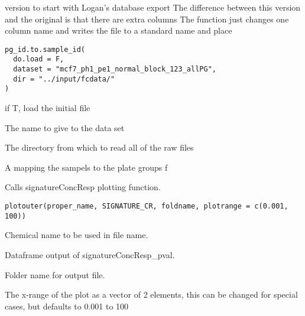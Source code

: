 \documentclass[letterpaper]{book}
\begin{document}
%
\begin{Description}\relax
version to start with Logan's database export
The difference between this version and the original is that there are extra columns
The function just changes one column name and writes the file to a standard name and place
\end{Description}
%
\begin{Usage}
\begin{verbatim}
pg_id.to.sample_id(
  do.load = F,
  dataset = "mcf7_ph1_pe1_normal_block_123_allPG",
  dir = "../input/fcdata/"
)
\end{verbatim}
\end{Usage}
%
\begin{Arguments}
\begin{ldescription}
\item[\code{do.load}] if T, load the initial file

\item[\code{dataset}] The name to give to the data set

\item[\code{dir}] The directory from which to read all of the raw files
\end{ldescription}
\end{Arguments}
%
\begin{Value}
A mapping the sampels to the plate groups
f
\end{Value}
%
\begin{Description}\relax
Calls signatureConcResp plotting function.
\end{Description}
%
\begin{Usage}
\begin{verbatim}
plotouter(proper_name, SIGNATURE_CR, foldname, plotrange = c(0.001, 100))
\end{verbatim}
\end{Usage}
%
\begin{Arguments}
\begin{ldescription}
\item[\code{proper\_name}] Chemical name to be used in file name.

\item[\code{SIGNATURE\_CR}] Dataframe output of signatureConcResp\_pval.

\item[\code{foldname}] Folder name for output file.

\item[\code{plotrange}] The x-range of the plot as a vector of 2 elements, this can be changed for special cases, but defaults to 0.001 to 100
\end{ldescription}
\end{Arguments}
\end{document}

